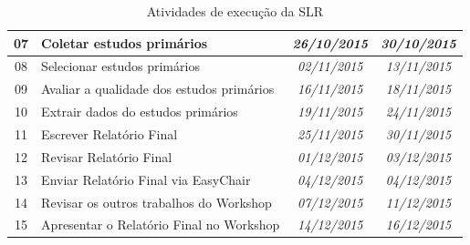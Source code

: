 \documentclass{article}
\begin{document}
\begin{table}[]
{\begin{tabular}{|c|l|c|c|}
07          & Coletar estudos primários                                                                                                                 & \textit{26/10/2015}                              & \textit{30/10/2015}                               \\ \hline
08          & Selecionar estudos primários                                                                                                              & \textit{02/11/2015}                              & \textit{13/11/2015}                               \\ \hline
09          & Avaliar a qualidade dos estudos primários                                                                                                 & \textit{16/11/2015}                              & \textit{18/11/2015}                               \\ \hline
10          & Extrair dados do estudos primários                                                                                                        & \textit{19/11/2015}                              & \textit{24/11/2015}                               \\ \hline
11          & Escrever Relatório Final                                                                                                                  & \textit{25/11/2015}                              & \textit{30/11/2015}                               \\ \hline
12          & Revisar Relatório Final                                                                                                                   & \textit{01/12/2015}                              & \textit{03/12/2015}                               \\ \hline
13          & Enviar Relatório Final via EasyChair                                                                                                      & \textit{04/12/2015}                              & \textit{04/12/2015}                               \\ \hline
14          & Revisar os outros trabalhos do Workshop                                                                                                   & \textit{07/12/2015}                              & \textit{11/12/2015}                               \\ \hline
15          & Apresentar o Relatório Final no Workshop                                                                                                  & \textit{14/12/2015}                              & \textit{16/12/2015}                               \\ \hline
\end{tabular}
}
\caption{Atividades de execução da SLR}
\label{tab:cronograma}
\end{table}
\pagebreak
\medskip


\end{document}
